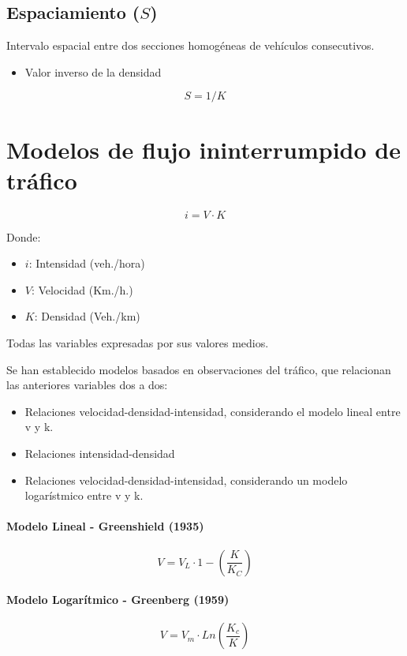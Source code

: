 \subsection{Espaciamiento ($S$)}
Intervalo espacial entre dos secciones homogéneas de vehículos consecutivos.
\begin{itemize}
    \item Valor inverso de la densidad
\end{itemize}

\begin{equation}
    S = 1 / K
\end{equation}

\section{Modelos de flujo ininterrumpido de tráfico}

\begin{equation}
    i = V \cdot K
\end{equation}

Donde:
\begin{itemize}
    \item $i$: Intensidad (veh./hora)
    \item $V$: Velocidad (Km./h.)
    \item $K$: Densidad (Veh./km)
\end{itemize}

Todas las variables expresadas por sus valores medios.

Se han establecido modelos basados en observaciones del tráfico, que relacionan las anteriores variables dos a dos:
\begin{itemize}
    \item Relaciones velocidad-densidad-intensidad, considerando el modelo lineal entre v y k.
    \item Relaciones intensidad-densidad
    \item Relaciones velocidad-densidad-intensidad, considerando un modelo logarístmico entre v y k.
\end{itemize}

\paragraph{Modelo Lineal - Greenshield (1935)}
\begin{equation}
    V = V_L \cdot 1 - ( \frac{K}{K_C} )
\end{equation}

\paragraph{Modelo Logarítmico - Greenberg (1959)}
\begin{equation}
    V = V_m \cdot Ln ( \frac{K_c}{K} )
\end{equation}

